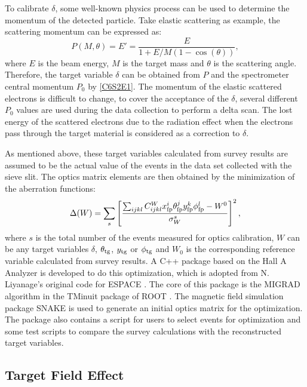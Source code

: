 To calibrate $\delta$, some well-known physics process can be used to determine the momentum of the detected particle. Take elastic scattering as example, the scattering momentum can be expressed as:
\begin{equation} \label{C6S2E10}
P(M,\theta) = E' = \frac{E}{1+E/M(1-\cos(\theta))},
\end{equation}
where $E$ is the beam energy, $M$ is the target mass and $\theta$ is the scattering angle. Therefore, the target variable $\delta$ can be obtained from $P$ and the spectrometer central momentum $P_0$ by \cref{C6S2E1}. The momentum of the elastic scattered electrons is difficult to change, to cover the acceptance of the $\delta$, several different $P_0$ values are used during the data collection to perform a delta scan. The lost energy of the scattered electrons due to the radiation effect when the electrons pass through the target material is considered as a correction to $\delta$.

As mentioned above, these target variables calculated from survey results are assumed to be the actual value of the events in the data set collected with the sieve slit. The optics matrix elements are then obtained by the minimization of the aberration functions:
\begin{equation} \label{C6S2E11}
\Delta (W) = \sum_s\left[\frac{\sum_{ijkl}C_{ijkl}^{W}x_{\mathrm{fp}}^i\theta_{\mathrm{fp}}^jy_{\mathrm{fp}}^k\phi_{\mathrm{fp}}^l-W^{0}}{\sigma_W^s}\right]^2,
\end{equation}
where $s$ is the total number of the events measured for optics calibration, $W$ can be any target variables $\delta$, $\theta_{\mathrm{tg}}$, $y_{\mathrm{tg}}$ or $\phi_{\mathrm{tg}}$ and $W_0$ is the corresponding reference variable calculated from survey results. A C++ package based on the Hall A Analyzer \cite{Hansen2015} is developed to do this optimization, which is adopted from N. Liyanage's original code \cite{Liyanage2002} for ESPACE \cite{ESPACE}. The core of this package is the MIGRAD algorithm in the TMinuit package of ROOT \cite{ROOT}. The magnetic field simulation package SNAKE is used to generate an initial optics matrix for the optimization. The package also contains a script for users to select events for optimization and some test scripts to compare the survey calculations with the reconstructed target variables.

\subsection{Target Field Effect}
\label{C6S2SS3}

